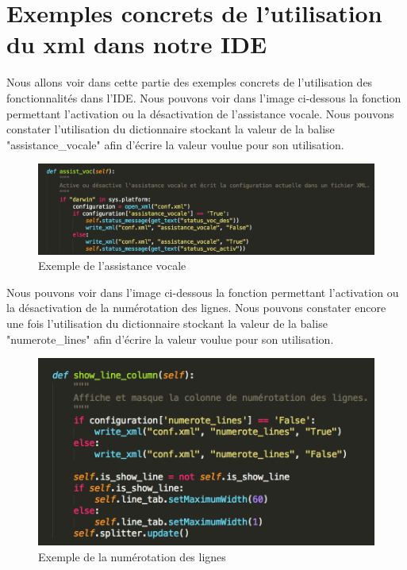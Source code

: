 \documentclass[a4paper,12pt]{article}
\begin{document}
\section{Exemples concrets de l’utilisation du xml dans notre IDE}

Nous allons voir dans cette partie des exemples concrets de l'utilisation des fonctionnalités dans l'IDE. Nous pouvons voir dans l'image ci-dessous la fonction permettant l'activation ou la désactivation de l'assistance vocale. Nous pouvons constater l'utilisation du dictionnaire stockant la valeur de la balise "assistance\_vocale" afin d'écrire la valeur voulue pour son utilisation.

\begin{figure}[h!]
			\begin{center}
				\includegraphics[scale=0.6]{images/assistance_vocale_code.png}
				\caption{Exemple de l'assistance vocale}
			\end{center}
		\end{figure}
		
Nous pouvons voir dans l'image ci-dessous la fonction permettant l'activation ou la désactivation de la numérotation des lignes. Nous pouvons constater encore une fois l'utilisation du dictionnaire stockant la valeur de la balise "numerote\_lines" afin d'écrire la valeur voulue pour son utilisation.

\begin{figure}[h!]
			\begin{center}
				\includegraphics[scale=0.6]{images/numerote_lines_code.png}
				\caption{Exemple de la numérotation des lignes}
			\end{center}
		\end{figure}
	
\end{document}
